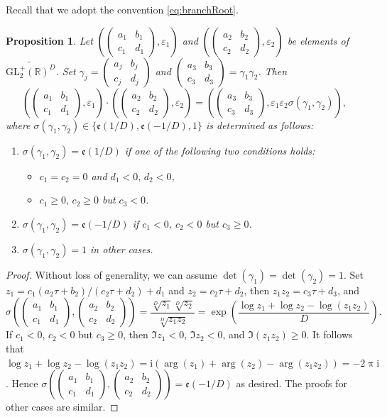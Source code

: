 \documentclass[12pt]{amsart}
\numberwithin{equation}{section}
\theoremstyle{plain}
\newtheorem{prop}[thm]{Proposition}
\theoremstyle{definition}
\theoremstyle{remark}
\newcommand\rmi{\mathrm{i}}
\newcommand\tbtmat[4]{\left(\begin{smallmatrix}{#1} & {#2} \\ {#3} & {#4}\end{smallmatrix}\right)}
\newcommand\etp[1]{\mathfrak{e}\left(#1\right)}
\newcommand\glpR{\mathrm{GL}_2^{+}(\mathbb{R})}
\newcommand\Dcover[2]{\widetilde{#1^{#2}}}
\begin{document}
\begin{appendix}
Recall that we adopt the convention \eqref{eq:branchRoot}.
\begin{prop}
Let $\left(\tbtmat{a_1}{b_1}{c_1}{d_1}, \varepsilon_1\right)$ and $\left(\tbtmat{a_2}{b_2}{c_2}{d_2}, \varepsilon_2\right)$ be elements of $\Dcover{\glpR}{D}$. Set $\gamma_j=\tbtmat{a_j}{b_j}{c_j}{d_j}$ and $\tbtmat{a_3}{b_3}{c_3}{d_3}=\gamma_1\gamma_2$. Then
\begin{equation*}
\left(\tbtmat{a_1}{b_1}{c_1}{d_1}, \varepsilon_1\right)\cdot\left(\tbtmat{a_2}{b_2}{c_2}{d_2}, \varepsilon_2\right)=\left(\tbtmat{a_3}{b_3}{c_3}{d_3}, \varepsilon_1\varepsilon_2\sigma(\gamma_1,\gamma_2)\right),
\end{equation*}
where $\sigma(\gamma_1,\gamma_2)\in\{\etp{1/D},\etp{-1/D},1\}$ is determined as follows:
\begin{enumerate}
  \item[(a)] $\sigma(\gamma_1,\gamma_2)=\etp{1/D}$ if one of the following two conditions holds:
  \begin{itemize}
    \item $c_1=c_2=0$ and $d_1<0,\,d_2<0$,
    \item $c_1 \geq 0,\, c_2 \geq 0$ but $c_3 < 0$.
  \end{itemize}
  \item[(b)] $\sigma(\gamma_1,\gamma_2)=\etp{-1/D}$ if $c_1 < 0$, $c_2 < 0$ but $c_3 \geq 0$.
  \item[(c)] $\sigma(\gamma_1,\gamma_2)=1$ in other cases.
\end{enumerate}
\end{prop}
\begin{proof}
Without loss of generality, we can assume $\det(\gamma_1)=\det(\gamma_2)=1$. Set $z_1=c_1(a_2\tau+b_2)/(c_2\tau+d_2)+d_1$ and $z_2=c_2\tau+d_2$, then $z_1z_2=c_3\tau+d_3$, and
$$\sigma\left(\tbtmat{a_1}{b_1}{c_1}{d_1},\tbtmat{a_2}{b_2}{c_2}{d_2}\right)=\frac{\sqrt[D]{z_1}\sqrt[D]{z_2}}{\sqrt[D]{z_1z_2}}=\exp\left(\frac{\log z_1+\log z_2 - \log(z_1z_2)}{D}\right).$$
If $c_1 < 0$, $c_2 < 0$ but $c_3 \geq 0$, then $\Im z_1<0$, $\Im z_2<0$, and $\Im(z_1z_2)\geq0$. It follows that $\log z_1+\log z_2 - \log(z_1z_2)=\rmi(\arg(z_1)+\arg(z_2)-\arg(z_1z_2))=-2\uppi\rmi$. Hence $\sigma\left(\tbtmat{a_1}{b_1}{c_1}{d_1},\tbtmat{a_2}{b_2}{c_2}{d_2}\right)=\etp{-1/D}$ as desired. The proofs for other cases are similar.
\end{proof}


\end{appendix}
\end{document}
